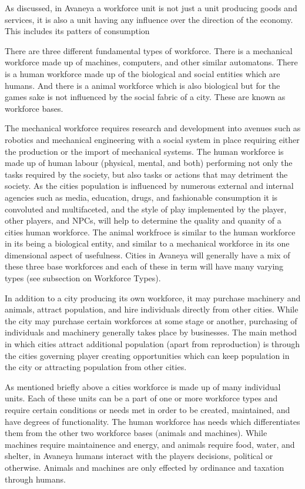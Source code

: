 As discussed, in Avaneya a workforce unit is not just a unit producing goods and services, it is also a unit having any influence over the direction of the economy. This includes its patters of consumption


There are three different fundamental types of workforce. There is a mechanical workforce made up of machines, computers, and other similar automatons. There is a human workforce made up of the biological and social entities which are humans. And there is a animal workforce which is also biological but for the games sake is not influenced by the social fabric of a city. These are known as workforce bases. 

The mechanical workforce requires research and development into avenues such as robotics and mechanical engineering with a social system in place requiring either the production or the import of mechanical systems. The human workforce is made up of human labour (physical, mental, and both) performing not only the tasks required by the society, but also tasks or actions that may detriment the society. As the cities population is influenced by numerous external and internal agencies such as media, education, drugs, and fashionable consumption it is convoluted and multifaceted, and the style of play implemented by the player, other players, and NPCs, will help to determine the quality and quanity of a cities human workforce. The animal workfroce is similar to the human workforce in its being a biological entity, and similar to a mechanical workforce in its one dimensional aspect of usefulness. Cities in Avaneya will generally have a mix of these three base workforces and each of these in term will have many varying types (see subsection on Workforce Types). 

In addition to a city producing its own workforce, it may purchase machinery and animals, attract population, and hire individuals directly from other cities. While the city may purchase certain workforces at some stage or another, purchasing of individuals and machinery generally takes place by businesses. The main method in which cities attract additional population (apart from reproduction) is through the cities governing player creating opportunities which can keep population in the city or attracting population from other cities. 


As mentioned briefly above a cities workforce is made up of many individual units. Each of these units can be a part of one or more workforce types and require certain conditions or needs met in order to be created, maintained, and have degrees of functionality. The human workforce has needs which differentiates them from the other two workforce bases (animals and machines). While machines require maintainence and energy, and animals require food, water, and shelter, in Avaneya humans interact with the players decisions, political or otherwise. Animals and machines are only effected by ordinance and taxation through humans. 


